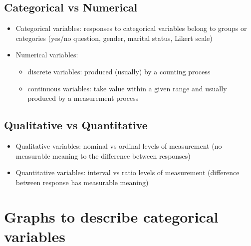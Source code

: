 \documentclass[
]{article}
\providecommand{\tightlist}{%
  \setlength{\itemsep}{0pt}\setlength{\parskip}{0pt}}
\begin{document}
\hypertarget{categorical-vs-numerical}{%
\subsection{Categorical vs Numerical}\label{categorical-vs-numerical}}

\begin{itemize}
\tightlist
\item
  Categorical variables: responses to categorical variables belong to
  groups or categories (yes/no question, gender, marital status, Likert
  scale)
\item
  Numerical variables:

  \begin{itemize}
  \tightlist
  \item
    discrete variables: produced (usually) by a counting process
  \item
    continuous variables: take value within a given range and usually
    produced by a measurement process
  \end{itemize}
\end{itemize}

\hypertarget{qualitative-vs-quantitative}{%
\subsection{Qualitative vs
Quantitative}\label{qualitative-vs-quantitative}}

\begin{itemize}
\tightlist
\item
  Qualitative variables: nominal vs ordinal levels of measurement (no
  measurable meaning to the difference between responses)
\item
  Quantitative variables: interval vs ratio levels of measurement
  (difference between response has measurable meaning)
\end{itemize}

\hypertarget{graphs-to-describe-categorical-variables}{%
\section{Graphs to describe categorical
variables}\label{graphs-to-describe-categorical-variables}}
\end{document}
